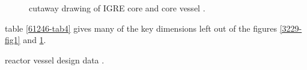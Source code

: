 \documentclass{article}
\begin{document}
\begin{preview}
\begin{figure}[H]
  \caption{cutaway drawing of IGRE core and core vessel \parencite[figure 1]{ornl-tm-0378}.}
  \label{0378-fig1}
\end{figure}

table \ref{61246-tab4} gives many of the key dimensions left out of the figures \ref{3229-fig1} and \ref{0378-fig1}.
\begin{table}[H]
  \centering
  \caption{reactor vessel design data \parencite[table 4]{ad-cf-61-2-46}.}
  \label{61246-tab4}
\end{table}



\end{preview}
\end{document}
